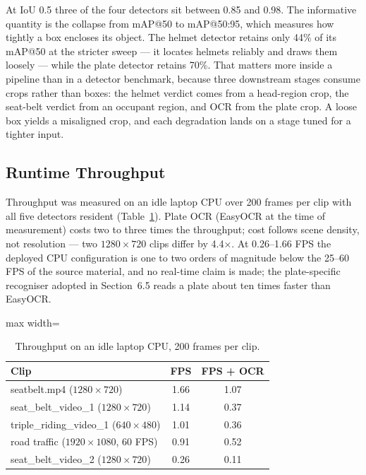 \documentclass[10pt,a4paper,twocolumn]{article}
\begin{document}
At IoU 0.5 three of the four detectors sit between 0.85 and 0.98. The informative quantity is the collapse from
mAP@50 to mAP@50:95, which measures how tightly a box encloses its object. The helmet detector retains only 44\% of its mAP@50 at the
stricter sweep --- it locates helmets reliably and draws them loosely --- while the plate detector retains 70\%. That
matters more inside a pipeline than in a detector benchmark, because three downstream stages consume crops rather than
boxes: the helmet verdict comes from a head-region crop, the seat-belt verdict from an occupant region, and OCR from the
plate crop. A loose box yields a misaligned crop, and each degradation lands on a stage tuned for a tighter input.

\subsection{Runtime Throughput}
Throughput was measured on an idle laptop CPU over 200 frames per clip with all five detectors resident (Table~\ref{tab:fps}).
Plate OCR (EasyOCR at the time of measurement) costs two to three times the throughput; cost follows scene density,
not resolution --- two $1280\times720$ clips differ by 4.4$\times$. At 0.26--1.66 FPS the deployed CPU configuration
is one to two orders of magnitude below the 25--60 FPS of the source material, and no real-time claim is made; the
plate-specific recogniser adopted in Section~6.5 reads a plate about ten times faster than EasyOCR.

\begin{table}[t]
\centering\scriptsize
\caption{Throughput on an idle laptop CPU, 200 frames per clip.}\label{tab:fps}
\begin{adjustbox}{max width=\columnwidth}
\begin{tabular}{@{}lcc@{}}
\toprule
Clip & FPS & FPS + OCR\\
\midrule
seatbelt.mp4 ($1280\times720$) & 1.66 & 1.07\\
seat\_belt\_video\_1 ($1280\times720$) & 1.14 & 0.37\\
triple\_riding\_video\_1 ($640\times480$) & 1.01 & 0.36\\
road traffic ($1920\times1080$, 60 FPS) & 0.91 & 0.52\\
seat\_belt\_video\_2 ($1280\times720$) & 0.26 & 0.11\\
\bottomrule
\end{tabular}
\end{adjustbox}
\end{table}
\end{document}
